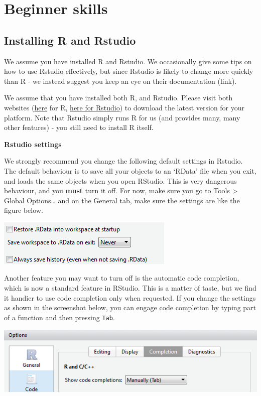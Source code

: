 \documentclass[]{book}
\begin{document}
\hypertarget{intro}{%
\chapter{Beginner skills}\label{intro}}

\hypertarget{installingr}{%
\section{Installing R and Rstudio}\label{installingr}}

We assume you have installed R and Rstudio. We occasionally give some tips on how to use Rstudio effectively, but since Rstudio is likely to change more quickly than R - we instead suggest you keep an eye on their documentation (link).

We assume that you have installed both R, and Rstudio. Please visit both websites (\href{http://cran.r-project.org}{here} for R, \href{www.rstudio.org}{here for Rstudio}) to download the latest version for your platform. Note that Rstudio simply runs R for us (and provides many, many other features) - you still need to install R itself.

\textbf{Rstudio settings}

We strongly recommend you change the following default settings in Rstudio. The default behaviour is to save all your objects to an `RData' file when you exit, and loads the same objects when you open RStudio. This is very dangerous behaviour, and you \textbf{must} turn it off. For now, make sure you go to Tools \textgreater{} Global Options\ldots{} and on the General tab, make sure the settings are like the figure below.

\includegraphics[width=0.4\linewidth]{screenshots/neverloadrdata}

Another feature you may want to turn off is the automatic code completion, which is now a standard feature in RStudio. This is a matter of taste, but we find it handier to use code completion only when requested. If you change the settings as shown in the screenshot below, you can engage code completion by typing part of a function and then pressing \texttt{Tab}.

\includegraphics[width=0.4\linewidth]{screenshots/rstudionocodecomplete}
\end{document}
